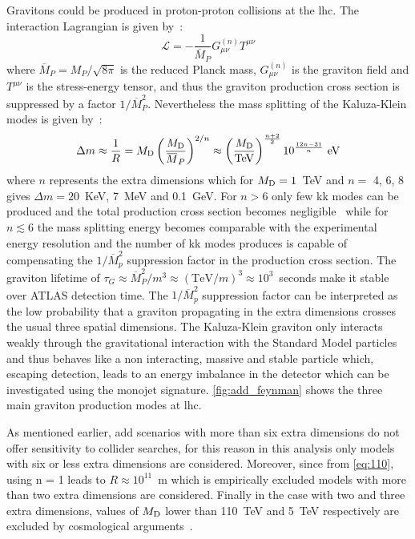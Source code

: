 Gravitons could be produced in proton-proton collisions at the \gls{lhc}. The
interaction Lagrangian is given by~\cite{ADDPhenomenology}:
\begin{equation}
  \label{eq:111}
  \mathcal{L} = - \frac{1}{\overbar{M}_P} G^{(n)}_{\mu\nu} T^{\mu\nu}
\end{equation}
where $\overbar{M}_P = M_P/\sqrt{8 \pi}$ is the reduced Planck mass,
$G^{(n)}_{\mu\nu}$ is the graviton field and $T^{\mu\nu}$ is the stress-energy
tensor, and thus the graviton production cross section is suppressed by a factor
$1/\overbar{M}^2_P$. Nevertheless the mass splitting of the Kaluza-Klein modes
is given by~\cite{ADDPhenomenology}:
\begin{equation}
  \label{eq:112}
  \Delta m \approx \frac{1}{R} = \md \left( \frac{\md}{\overbar{M}_P}
  \right)^{2/n} \approx \left( \frac{\md}{\mathrm{TeV}} \right)^{\frac{n +
  2}{2}} 10^{\frac{12 n - 31}{n}}~\mathrm{eV}
\end{equation}
where $n$ represents the extra dimensions which for $M_\mathrm{D} = 1$~TeV and $n =$ 4,
6, 8 gives $\Delta m = 20$~KeV, 7~MeV and 0.1~GeV. For $n > 6$ only few \gls{kk}
modes can be produced and the total production cross section becomes
negligible~\cite{ADDPhenomenology} while for $n \lesssim 6$ the mass splitting
energy becomes comparable with the experimental energy resolution and the number
of \gls{kk} modes produces is capable of compensating the $1/\overbar{M}^2_p$
suppression factor in the production cross section. The graviton lifetime of
$\tau_G \approx \overbar{M}^2_P/m^3 \approx (\mathrm{TeV}/m)^3 \approx
10^3$~seconds make it stable over ATLAS detection time. The $1/\overbar{M}^2_p$
suppression factor can be interpreted as the low probability that a graviton
propagating in the extra dimensions crosses the usual three spatial
dimensions. The Kaluza-Klein graviton only interacts weakly through the
gravitational interaction with the Standard Model particles and thus behaves
like a non interacting, massive and stable particle which, escaping detection,
leads to an energy imbalance in the detector which can be investigated using the
monojet signature. \cref{fig:add_feynman} shows the three main graviton
production modes at \gls{lhc}.

As mentioned earlier, \gls{add} scenarios with more than six extra dimensions do
not offer sensitivity to collider searches, for this reason in this analysis
only models with six or less extra dimensions are considered. Moreover, since
from \cref{eq:110}, using n = 1 leads to $R \approx 10^{11}$~m which is
empirically excluded models with more than two extra dimensions are
considered. Finally in the case with two and three extra dimensions, values of
$M_\mathrm{D}$ lower than 110~TeV and 5~TeV respectively are excluded by cosmological
arguments~\cite{ADDCosmology}.

